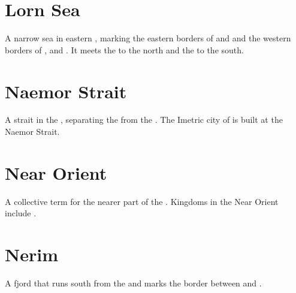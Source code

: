 \section{Lorn Sea}
A narrow sea in eastern , marking the eastern borders of  and  and the western borders of ,  and . It meets the  to the north and the  to the south. 
















\section{Naemor Strait}
A strait in the , separating the  from the . The Imetric city of  is built at the Naemor Strait. 
















\section{Near Orient}
A collective term for the nearer part of the . 
Kingdoms in the Near Orient include . 
















\section{Nerim} 
A fjord that runs south from the  and marks the border between  and . 
















